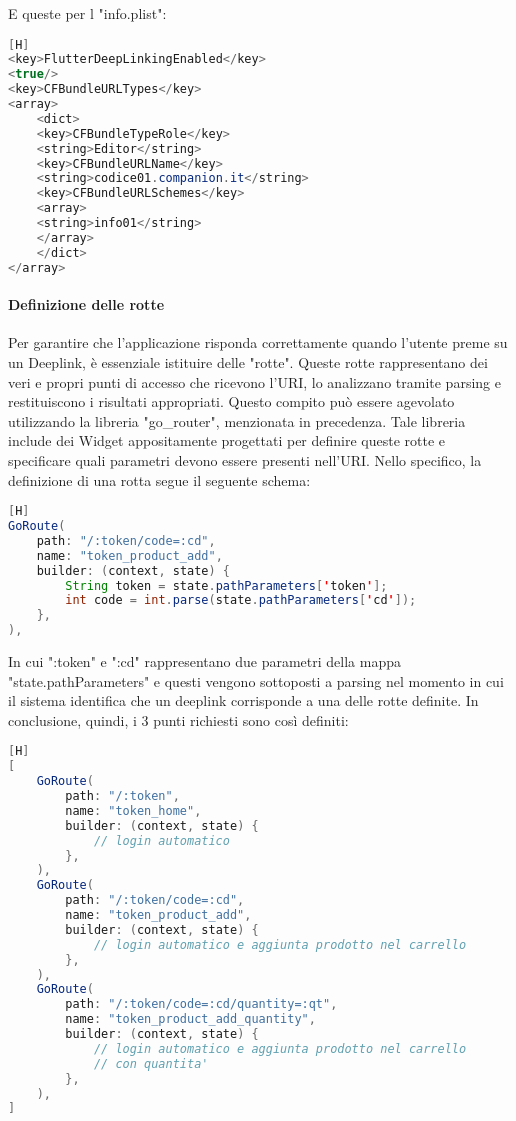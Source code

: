 \newpage
\noindent
E queste per l "info.plist":
\begin{lstlisting}[language=Java, firstnumber=1][H]
<key>FlutterDeepLinkingEnabled</key>
<true/>
<key>CFBundleURLTypes</key>
<array>
    <dict>
    <key>CFBundleTypeRole</key>
    <string>Editor</string>
    <key>CFBundleURLName</key>
    <string>codice01.companion.it</string>
    <key>CFBundleURLSchemes</key>
    <array>
    <string>info01</string>
    </array>
    </dict>
</array>
\end{lstlisting}

\noindent
\paragraph{Definizione delle rotte}
Per garantire che l'applicazione risponda correttamente quando l'utente preme su un Deeplink, è essenziale istituire delle "rotte". Queste rotte rappresentano dei veri e propri punti di accesso che ricevono l'URI, lo analizzano tramite parsing e restituiscono i risultati appropriati. Questo compito può essere agevolato utilizzando la libreria "go\_router", menzionata in precedenza. Tale libreria include dei Widget appositamente progettati per definire queste rotte e specificare quali parametri devono essere presenti nell'URI. Nello specifico, la definizione di una rotta segue il seguente schema:
\begin{lstlisting}[language=Java, firstnumber=1][H]
GoRoute(
	path: "/:token/code=:cd",
	name: "token_product_add",
	builder: (context, state) {
		String token = state.pathParameters['token'];
		int code = int.parse(state.pathParameters['cd']);
	},
),
\end{lstlisting}

\noindent
In cui ":token" e ":cd" rappresentano due parametri della mappa "state.pathParameters" e questi vengono sottoposti a parsing nel momento in cui il sistema identifica che un deeplink corrisponde a una delle rotte definite. In conclusione, quindi, i 3 punti richiesti sono così definiti:
\newpage
\begin{lstlisting}[language=Java][H]
[
	GoRoute(
		path: "/:token",
		name: "token_home",
		builder: (context, state) {
			// login automatico
		},
	),
	GoRoute(
		path: "/:token/code=:cd",
		name: "token_product_add",
		builder: (context, state) {
			// login automatico e aggiunta prodotto nel carrello
		},
	),
	GoRoute(
		path: "/:token/code=:cd/quantity=:qt",
		name: "token_product_add_quantity",
		builder: (context, state) {
			// login automatico e aggiunta prodotto nel carrello
			// con quantita'
		},
	),
]
\end{lstlisting}

